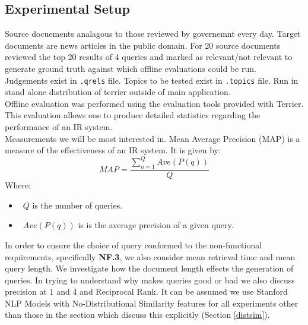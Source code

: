\documentclass{l4proj}
\newcommand{\code}[1]{\texttt{#1}}
\begin{document}
\subsection{Experimental Setup}
Source docuements analagous to those reviewed by governemnt every day.
Target documents are news articles in the public domain.
For 20 source documents reviewed the top 20 results of 4 queries and marked as relevant/not relevant to generate ground truth against which offline evaluations could be run.\\
Judgements exist in \code{.qrels} file.
Topics to be tested exist in \code{.topics} file.
Run in stand alone distribution of terrier outside of main application.\\
Offline evaluation was performed using the evaluation tools provided with Terrier. This evaluation allows one to produce detailed statistics regarding the performance of an IR system.\\

Measurements we will be most interested in.
Mean Average Precision (MAP) is a measure of the effectiveness of an IR system.
It is given by:
\begin{displaymath}
  MAP=\frac{\sum_{n=1}^{Q} Ave(P(q))}{Q}
\end{displaymath}
Where: 
\begin{itemize}
\item{~$Q$ is the number of queries.}
\item{~$Ave(P(q))$ is is the average precision of a given query.}
\end{itemize}
In order to ensure the choice of query conformed to the non-functional requirements, specifically \textbf{NF.3}, we also consider mean retrieval time and mean query length.
We investigate how the document length effects the generation of queries. In trying to understand why makes queries good or bad we also discuss precision at 1 and 4 and Reciprocal Rank.
It can be assumed we use Stanford NLP Models with No-Distributional Similarity features for all experiments other than those in the section which discuss this explicitly (Section \ref{distsim}).
\end{document}
